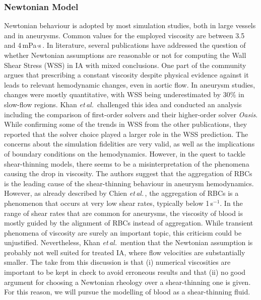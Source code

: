\subsubsection*{Newtonian Model}
Newtonian behaviour is adopted by most simulation studies, both in large vessels and in aneurysms. Common values for the employed viscosity are between 3.5 and 4\,mPa$\cdot$s\,\cite{Valen-Sendstad2018, Berg2019, Berg2019_rev}. In literature, several publications have addressed the question of whether Newtonian assumptions are reasonable or not for computing the Wall Shear Stress (WSS) in IA with mixed conclusions. One part of the community\cite{Lynch2022, Suzuki2021, Xiang2012} argues that prescribing a constant viscosity despite physical evidence against it leads to relevant hemodynamic changes, even in aortic flow. In aneurysm studies, changes were mostly quantitative, with WSS being underestimated by 30\% in slow-flow regions. Khan \textit{et\,al.}\,\cite{Khan2017} challenged this idea and conducted an analysis including the comparison of first-order solvers and their higher-order solver \textit{Oasis}. While confirming some of the trends in WSS from the other publications, they reported that the solver choice played a larger role in the WSS prediction. The concerns about the simulation fidelities are very valid, as well as the implications of boundary conditions on the hemodynamics. However, in the quest to tackle shear-thinning models, there seems to be a misinterpretation of the phenomena causing the drop in viscosity. The authors suggest that the aggregation of RBCs is the leading cause of the shear-thinning behaviour in aneurysm hemodynamics. However, as already described by Chien \textit{et\,al.}\,\cite{Chien1970}, the aggregation of RBCs is a phenomenon that occurs at very low shear rates, typically below 1\,s$^{-1}$. In the range of shear rates that are common for aneurysms, the viscosity of blood is mostly guided by the alignment of RBCs instead of aggregation. While transient phenomena of viscosity are surely an important topic, this criticism could be unjustified. Nevertheless, Khan \textit{et\,al.}\,\cite{Khan2017} mention that the Newtonian assumption is probably not well suited for treated IA, where flow velocities are substantially smaller. The take from this discussion is that (i) numerical viscosities are important to be kept in check to avoid erroneous results and that (ii) no good argument for choosing a Newtonian rheology over a shear-thinning one is given. For this reason, we will pursue the modelling of blood as a shear-thinning fluid.



